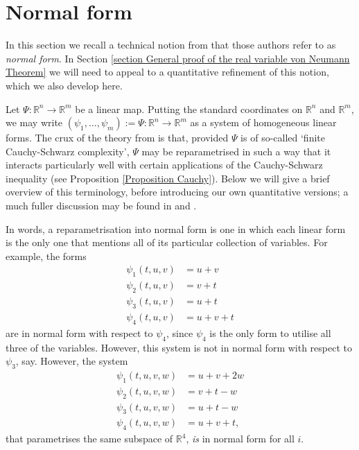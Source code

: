 \documentclass[12pt,a4paper,twoside,reqno]{amsart}
\numberwithin{equation}{section}
\begin{document}
\section{Normal form}
\label{section normal form}

In this section we recall a technical notion from \cite{GT10} that those authors refer to as \emph{normal form}. In Section \ref{section General proof of the real variable von Neumann Theorem} we will need to appeal to a quantitative refinement of this notion, which we also develop here.

Let $\Psi:\mathbb{R}^n \longrightarrow \mathbb{R}^m$ be a linear map. Putting the standard coordinates on $\mathbb{R}^n$ and $\mathbb{R}^m$, we may write  $(\psi_1,\dots,\psi_m) := \Psi:\mathbb{R}^n \longrightarrow \mathbb{R}^m$ as a system of homogeneous linear forms. The crux of the theory from \cite{GT10} is that, provided $\Psi$ is of so-called `finite Cauchy-Schwarz complexity', $\Psi$ may be reparametrised in such a way that it interacts particularly well with certain applications of the Cauchy-Schwarz inequality (see Proposition \ref{Proposition Cauchy}). Below we will give a brief overview of this terminology, before introducing our own quantitative versions; a much fuller discussion may be found in \cite[Section 1]{GT10} and \cite{GoWo10}.

In words, a reparametrisation into normal form is one in which each linear form is the only one that mentions all of its particular collection of variables. For example, the forms
\begin{align}
\label{not normal form}
\psi_1(t,u,v) & = u + v\nonumber\\
\psi_2(t,u,v) & = v + t\nonumber\\
\psi_3(t,u,v) & = u + t\nonumber\\
\psi_4(t,u,v) & = u+v+t
\end{align}
\noindent are in normal form with respect to $\psi_4$, since $\psi_4$ is the only form to utilise all three of the variables. However, this system is not in normal form with respect to $\psi_3$, say. However, the system 
\begin{align}
\label{not normal form becomes normal}
\psi_1(t,u,v,w) & = u + v + 2w\nonumber\\
\psi_2(t,u,v,w) & = v + t - w\nonumber\\
\psi_3(t,u,v,w) & = u + t - w\nonumber\\
\psi_4(t,u,v,w) & = u+v+t,
\end{align}
\noindent that parametrises the same subspace of $\mathbb{R}^4$, \emph{is} in normal form for all $i$.
\end{document}
